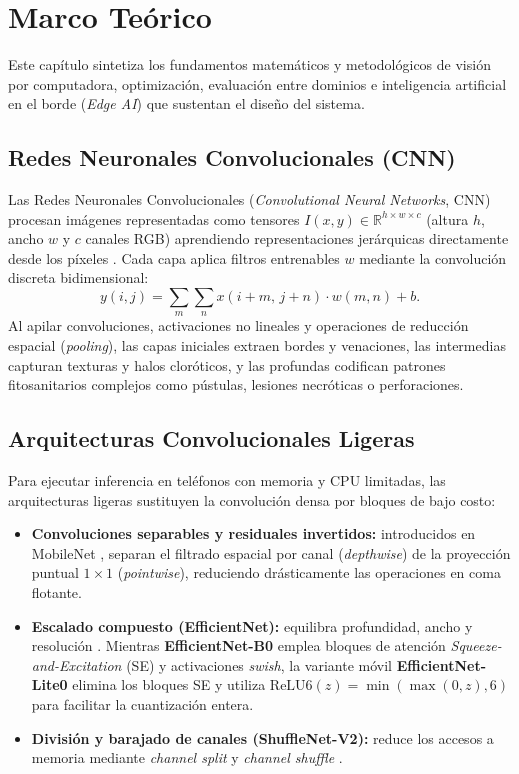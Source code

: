 \chapter{Marco Te\'orico}

Este cap\'itulo sintetiza los fundamentos matem\'aticos y metodol\'ogicos de visi\'on por computadora, optimizaci\'on, evaluaci\'on entre dominios e inteligencia artificial en el borde (\textit{Edge AI}) que sustentan el dise\~no del sistema.

\section{Redes Neuronales Convolucionales (CNN)}

Las Redes Neuronales Convolucionales (\textit{Convolutional Neural Networks}, CNN) procesan im\'agenes representadas como tensores $I(x, y) \in \mathbb{R}^{h \times w \times c}$ (altura $h$, ancho $w$ y $c$ canales RGB) aprendiendo representaciones jer\'arquicas directamente desde los p\'ixeles \cite{chollet2021}. Cada capa aplica filtros entrenables $w$ mediante la convoluci\'on discreta bidimensional:
\begin{equation}
y(i, j) = \sum_{m} \sum_{n} x(i + m,\, j + n)\cdot w(m, n) + b.
\end{equation}
Al apilar convoluciones, activaciones no lineales y operaciones de reducci\'on espacial (\textit{pooling}), las capas iniciales extraen bordes y venaciones, las intermedias capturan texturas y halos clor\'oticos, y las profundas codifican patrones fitosanitarios complejos como p\'ustulas, lesiones necr\'oticas o perforaciones.

\section{Arquitecturas Convolucionales Ligeras}

Para ejecutar inferencia en tel\'efonos con memoria y CPU limitadas, las arquitecturas ligeras sustituyen la convoluci\'on densa por bloques de bajo costo:
\begin{itemize}
\item \textbf{Convoluciones separables y residuales invertidos:} introducidos en MobileNet \cite{howard2017,sandler2018}, separan el filtrado espacial por canal (\textit{depthwise}) de la proyecci\'on puntual $1\times1$ (\textit{pointwise}), reduciendo dr\'asticamente las operaciones en coma flotante.
\item \textbf{Escalado compuesto (EfficientNet):} equilibra profundidad, ancho y resoluci\'on \cite{tan2019}. Mientras \textbf{EfficientNet-B0} emplea bloques de atenci\'on \textit{Squeeze-and-Excitation} (SE) \cite{hu2018} y activaciones \textit{swish}, la variante m\'ovil \textbf{EfficientNet-Lite0} \cite{tfblog2020} elimina los bloques SE y utiliza $\text{ReLU6}(z)=\min(\max(0,z),6)$ para facilitar la cuantizaci\'on entera.
\item \textbf{Divisi\'on y barajado de canales (ShuffleNet-V2):} reduce los accesos a memoria mediante \textit{channel split} y \textit{channel shuffle} \cite{ma2018}.
\end{itemize}

